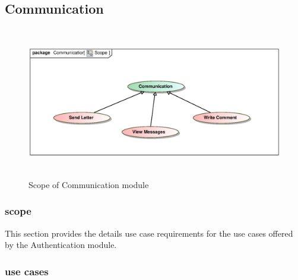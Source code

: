 \documentclass[12pt]{article}
\begin{document}
\subsection{Communication}

\begin{figure}[h]
\includegraphics[height=250px, width=500px]{epsImages/Communication/CommunicationScope.eps}
\caption{Scope of Communication module}
\end{figure}

\subsubsection{scope}
\par{This section provides the details use case requirements for the use cases offered by the Authentication
module.}

\subsubsection{use cases}
\end{document}
